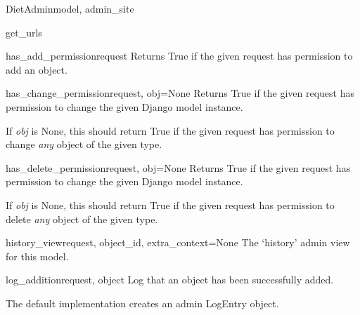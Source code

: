 \documentclass[letterpaper,10pt,english]{sphinxmanual}
\begin{document}
\begin{classdesc}{DietAdmin}{model, admin\_site}
\hypertarget{data.admin.DietAdmin.get_urls}{}\begin{methoddesc}{get\_urls}{}\end{methoddesc}

\hypertarget{data.admin.DietAdmin.has_add_permission}{}\begin{methoddesc}{has\_add\_permission}{request}
Returns True if the given request has permission to add an object.
\end{methoddesc}

\hypertarget{data.admin.DietAdmin.has_change_permission}{}\begin{methoddesc}{has\_change\_permission}{request, obj=None}
Returns True if the given request has permission to change the given
Django model instance.

If \emph{obj} is None, this should return True if the given request has
permission to change \emph{any} object of the given type.
\end{methoddesc}

\hypertarget{data.admin.DietAdmin.has_delete_permission}{}\begin{methoddesc}{has\_delete\_permission}{request, obj=None}
Returns True if the given request has permission to change the given
Django model instance.

If \emph{obj} is None, this should return True if the given request has
permission to delete \emph{any} object of the given type.
\end{methoddesc}

\hypertarget{data.admin.DietAdmin.history_view}{}\begin{methoddesc}{history\_view}{request, object\_id, extra\_context=None}
The `history' admin view for this model.
\end{methoddesc}

\hypertarget{data.admin.DietAdmin.log_addition}{}\begin{methoddesc}{log\_addition}{request, object}
Log that an object has been successfully added.

The default implementation creates an admin LogEntry object.
\end{methoddesc}


\end{classdesc}
\end{document}
